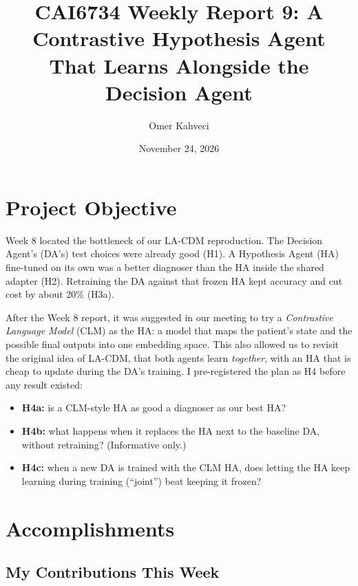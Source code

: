 \documentclass[11pt]{article}
\title{CAI6734 Weekly Report 9: A Contrastive Hypothesis Agent That Learns Alongside the Decision Agent}
\author{Omer Kahveci}
\date{November 24, 2026}
\begin{document}
\maketitle

\section{Project Objective}

Week 8 located the bottleneck of our LA-CDM reproduction. The Decision Agent's
(DA's) test choices were already good (H1). A Hypothesis Agent (HA) fine-tuned
on its own was a better diagnoser than the HA inside the shared adapter (H2).
Retraining the DA against that frozen HA kept accuracy and cut cost by about
20\% (H3a).

After the Week 8 report, it was suggested in our meeting to try a \emph{Contrastive Language
Model} (CLM) as the HA: a model that maps the patient's state and the possible
final outputs into one embedding space. This also allowed us to revisit the
original idea of LA-CDM, that both agents learn \emph{together}, with an HA
that is cheap to update during the DA's training. I pre-registered the plan as
H4 before any result existed:

\begin{itemize}
  \item \textbf{H4a:} is a CLM-style HA as good a diagnoser as our best HA?
  \item \textbf{H4b:} what happens when it replaces the HA next to the baseline
        DA, without retraining? (Informative only.)
  \item \textbf{H4c:} when a new DA is trained with the CLM HA, does letting the
        HA keep learning during training (``joint'') beat keeping it frozen?
\end{itemize}

\section{Accomplishments}

\subsection*{My Contributions This Week}
\end{document}
